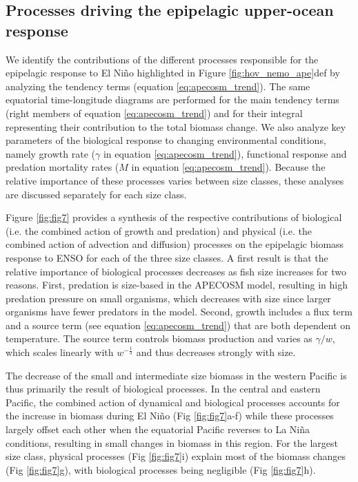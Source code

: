 \subsection{Processes driving the epipelagic upper-ocean response}

We identify the contributions of the different processes responsible for the epipelagic response to El Niño highlighted in Figure \ref{fig:hov_nemo_ape}def by analyzing the tendency terms (equation \ref{eq:apecosm_trend}). The same equatorial time-longitude diagrams are performed for the main tendency terms (right members of equation \ref{eq:apecosm_trend}) and for their integral representing their contribution to the total biomass change. We also analyze key parameters of the biological response to changing environmental conditions, namely growth rate ($\gamma$ in equation \ref{eq:apecosm_trend}), functional response and predation mortality rates ($M$ in equation \ref{eq:apecosm_trend}). Because the relative importance of these processes varies between size classes, these analyses are discussed separately for each size class.

Figure \ref{fig:fig7} provides a synthesis of the respective contributions of biological (i.e. the combined action of growth and predation) and physical (i.e. the combined action of advection and diffusion) processes on the epipelagic biomass response to ENSO for each of the three size classes. A first result is that the relative importance of biological processes decreases as fish size increases for two reasons. First, predation is size-based in the APECOSM model, resulting in high predation pressure on small organisms, which decreases with size since larger organisms have fewer predators in the model. Second, growth includes a flux term and a source term (see equation \ref{eq:apecosm_trend}) that are both dependent on temperature. The source term controls biomass production and varies as ${\gamma}/{w}$, which scales linearly with $w^{-\frac{1}{3}}$ and thus decreases strongly with size.

The decrease of the small and intermediate size biomass in the western Pacific is thus primarily the result of biological processes. In the central and eastern Pacific, the combined action of dynamical and biological processes accounts for the increase in biomass during El Niño (Fig \ref{fig:fig7}a-f) while these processes largely offset each other when the equatorial Pacific reverses to La Niña conditions, resulting in small  changes in biomass in this region. For the largest size class, physical processes (Fig \ref{fig:fig7}i) explain most of the biomass changes (Fig \ref{fig:fig7}g), with biological processes being negligible (Fig \ref{fig:fig7}h).

